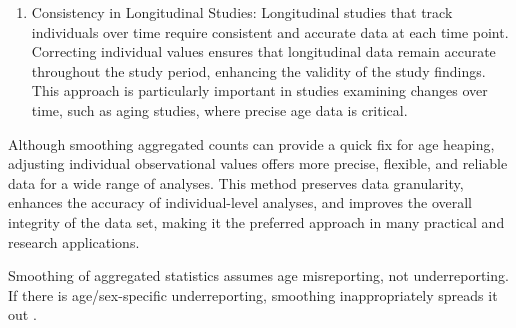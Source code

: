 \documentclass[pdflatex,sn-mathphys-num]{sn-jnl}%
\theoremstyle{thmstyleone}%
\theoremstyle{thmstyletwo}%
\theoremstyle{thmstylethree}%
\begin{document}
\begin{enumerate}
\item Consistency in Longitudinal Studies:
   Longitudinal studies that track individuals over time require consistent and accurate data at each time point. Correcting individual values ensures that longitudinal data remain accurate throughout the study period, enhancing the validity of the study findings. This approach is particularly important in studies examining changes over time, such as aging studies, where precise age data is critical.
\end{enumerate}


Although smoothing aggregated counts can provide a quick fix for age heaping, adjusting individual observational values offers more precise, flexible, and reliable data for a wide range of analyses. This method preserves data granularity, enhances the accuracy of individual-level analyses, and improves the overall integrity of the data set, making it the preferred approach in many practical and research applications.





Smoothing of aggregated statistics assumes age misreporting, not underreporting. If there is age/sex-specific underreporting, smoothing inappropriately spreads it out \citep{preston1999}.




\end{document}
